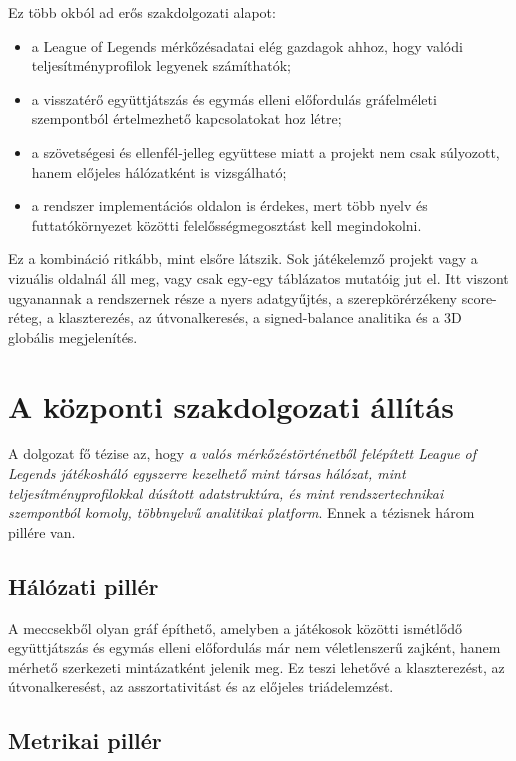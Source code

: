 \documentclass[a4paper,12pt]{report}
\begin{document}
Ez több okból ad erős szakdolgozati alapot:

\begin{itemize}
    \item a League of Legends mérkőzésadatai elég gazdagok ahhoz, hogy valódi teljesítményprofilok legyenek számíthatók;
    \item a visszatérő együttjátszás és egymás elleni előfordulás gráfelméleti szempontból értelmezhető kapcsolatokat hoz létre;
    \item a szövetségesi és ellenfél-jelleg együttese miatt a projekt nem csak súlyozott, hanem előjeles hálózatként is vizsgálható;
    \item a rendszer implementációs oldalon is érdekes, mert több nyelv és futtatókörnyezet közötti felelősségmegosztást kell megindokolni.
\end{itemize}

Ez a kombináció ritkább, mint elsőre látszik. Sok játékelemző projekt vagy a vizuális oldalnál áll meg, vagy csak egy-egy táblázatos mutatóig jut el. Itt viszont ugyanannak a rendszernek része a nyers adatgyűjtés, a szerepkörérzékeny score-réteg, a klaszterezés, az útvonalkeresés, a signed-balance analitika és a 3D globális megjelenítés.

\section{A központi szakdolgozati állítás}

A dolgozat fő tézise az, hogy \emph{a valós mérkőzéstörténetből felépített League of Legends játékosháló egyszerre kezelhető mint társas hálózat, mint teljesítményprofilokkal dúsított adatstruktúra, és mint rendszertechnikai szempontból komoly, többnyelvű analitikai platform}. Ennek a tézisnek három pillére van.

\subsection{Hálózati pillér}

A meccsekből olyan gráf építhető, amelyben a játékosok közötti ismétlődő együttjátszás és egymás elleni előfordulás már nem véletlenszerű zajként, hanem mérhető szerkezeti mintázatként jelenik meg. Ez teszi lehetővé a klaszterezést, az útvonalkeresést, az asszortativitást és az előjeles triádelemzést.

\subsection{Metrikai pillér}
\end{document}
